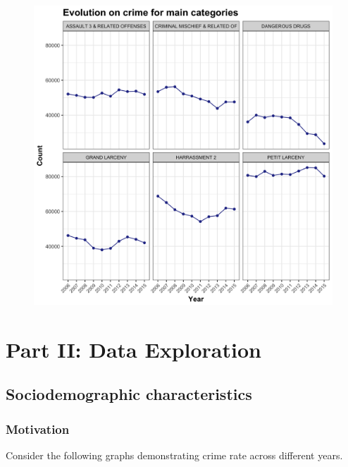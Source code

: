 \documentclass{article}
\begin{document}
\begin{figure}[H]
\centering
\includegraphics[scale=0.15]{7_MainCatsOverTime.png}
\end{figure}

\pagebreak
\section{Part II: Data Exploration}
\subsection{Sociodemographic characteristics}

\subsubsection{Motivation}

Consider the following graphs demonstrating crime rate across different years.
\end{document}
